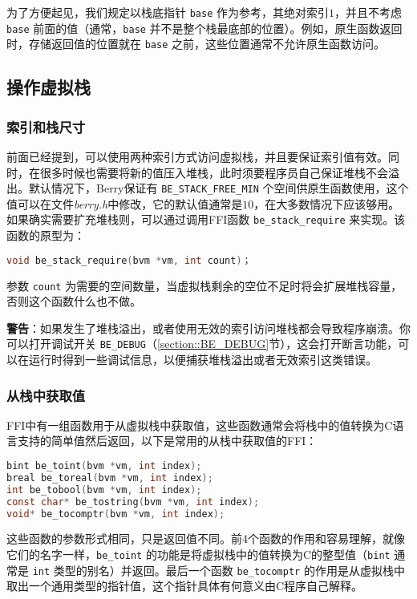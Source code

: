 为了方便起见，我们规定以栈底指针 \texttt{base} 作为参考，其绝对索引$1$，并且不考虑 \texttt{base} 前面的值（通常，\texttt{base} 并不是整个栈最底部的位置）。例如，原生函数返回时，存储返回值的位置就在 \texttt{base} 之前，这些位置通常不允许原生函数访问。

\subsection{操作虚拟栈}

\subsubsection{索引和栈尺寸}

前面已经提到，可以使用两种索引方式访问虚拟栈，并且要保证索引值有效。同时，在很多时候也需要将新的值压入堆栈，此时须要程序员自己保证堆栈不会溢出。默认情况下，Berry保证有 \texttt{BE\_STACK\_FREE\_MIN} 个空间供原生函数使用，这个值可以在文件\textit{berry.h}中修改，它的默认值通常是$10$，在大多数情况下应该够用。如果确实需要扩充堆栈则，可以通过调用FFI函数 \texttt{be\_stack\_require} 来实现。该函数的原型为：
\begin{lstlisting}[language=c, style=berry, numbers=none]
void be_stack_require(bvm *vm, int count)；
\end{lstlisting}
参数 \texttt{count} 为需要的空间数量，当虚拟栈剩余的空位不足时将会扩展堆栈容量，否则这个函数什么也不做。

\textbf{警告}：如果发生了堆栈溢出，或者使用无效的索引访问堆栈都会导致程序崩溃。你可以打开调试开关 \texttt{BE\_DEBUG}（\ref{section::BE_DEBUG}节），这会打开断言功能，可以在运行时得到一些调试信息，以便捕获堆栈溢出或者无效索引这类错误。

\subsubsection{从栈中获取值}

FFI中有一组函数用于从虚拟栈中获取值，这些函数通常会将栈中的值转换为C语言支持的简单值然后返回，以下是常用的从栈中获取值的FFI：
\begin{lstlisting}[language=c, style=berry, numbers=none]
bint be_toint(bvm *vm, int index);
breal be_toreal(bvm *vm, int index);
int be_tobool(bvm *vm, int index);
const char* be_tostring(bvm *vm, int index);
void* be_tocomptr(bvm *vm, int index);
\end{lstlisting}
这些函数的参数形式相同，只是返回值不同。前4个函数的作用和容易理解，就像它们的名字一样，\texttt{be\_toint} 的功能是将虚拟栈中的值转换为C的整型值（\texttt{bint} 通常是 \texttt{int} 类型的别名）并返回。最后一个函数 \texttt{be\_tocomptr} 的作用是从虚拟栈中取出一个通用类型的指针值，这个指针具体有何意义由C程序自己解释。

